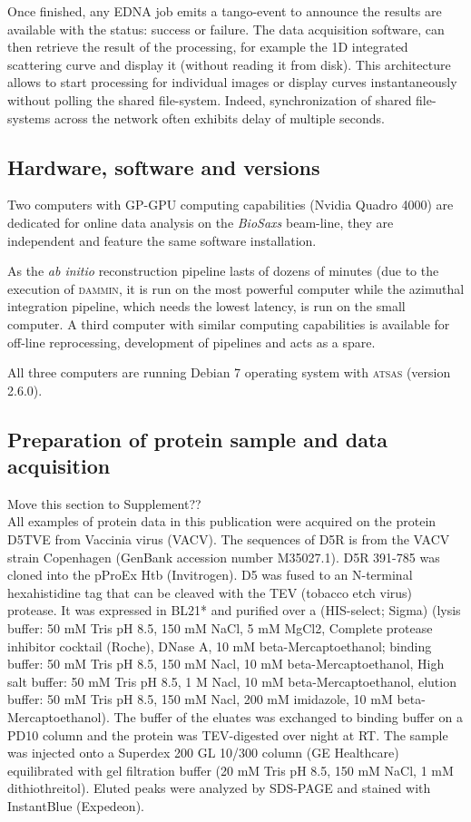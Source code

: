 \documentclass[preprint,pdf]{iucr}              %
\begin{document}
Once finished, any EDNA job emits a tango-event to announce the results are
available with the status: success or failure.
The data acquisition software, can then retrieve the result
of the processing, for example the 1D integrated scattering curve and
display it (without reading it from disk).
This architecture allows to start processing for individual images or
display curves instantaneously without polling the shared file-system.
Indeed, synchronization of shared file-systems across the network
often exhibits delay of multiple seconds.

\subsection{Hardware, software and versions}
Two computers with GP-GPU computing capabilities (Nvidia Quadro 4000) are
dedicated for online data analysis on the \textit{BioSaxs} beam-line, they are
independent and feature the same software installation.

As the \textit{ab initio} reconstruction pipeline lasts of dozens of minutes
(due to the execution of \textsc{dammin}, it is run on the most powerful
computer while the azimuthal integration pipeline, which needs the lowest latency, is run on
the small computer.
A third computer with similar computing capabilities is available for
off-line reprocessing, development of pipelines and acts as a spare.

All three computers are running Debian 7 operating system with \textsc{atsas}
(version 2.6.0).


\subsection{Preparation of protein sample and data acquisition}
 Move this section to Supplement??\\
All examples of protein data in this publication were acquired on the protein
D5TVE from Vaccinia virus (VACV).
The sequences of D5R is from the VACV strain Copenhagen (GenBank accession
number M35027.1). D5R 391-785 was cloned into the pProEx Htb (Invitrogen).
D5 was fused to an N-terminal hexahistidine tag that can be cleaved with the TEV
(tobacco etch virus) protease.
It was expressed in BL21* and purified over a (HIS-select; Sigma) (lysis buffer:
50 mM Tris pH 8.5, 150 mM NaCl, 5 mM MgCl2, Complete protease inhibitor cocktail
(Roche), DNase A, 10 mM beta-Mercaptoethanol; binding buffer: 50 mM Tris pH 8.5,
150 mM Nacl, 10 mM beta-Mercaptoethanol, High salt buffer: 50 mM Tris pH 8.5, 1
M Nacl, 10 mM beta-Mercaptoethanol, elution buffer: 50 mM Tris pH 8.5, 150 mM
Nacl,  200 mM imidazole, 10 mM beta-Mercaptoethanol).
The buffer of the eluates was exchanged to binding buffer on a PD10 column and
the protein was TEV-digested over night at RT.
The sample was injected onto a Superdex 200 GL 10/300 column (GE Healthcare)
equilibrated with gel filtration buffer (20 mM Tris pH 8.5, 150 mM NaCl, 1 mM dithiothreitol).
Eluted peaks were analyzed by SDS-PAGE and stained with InstantBlue (Expedeon).
\end{document}
